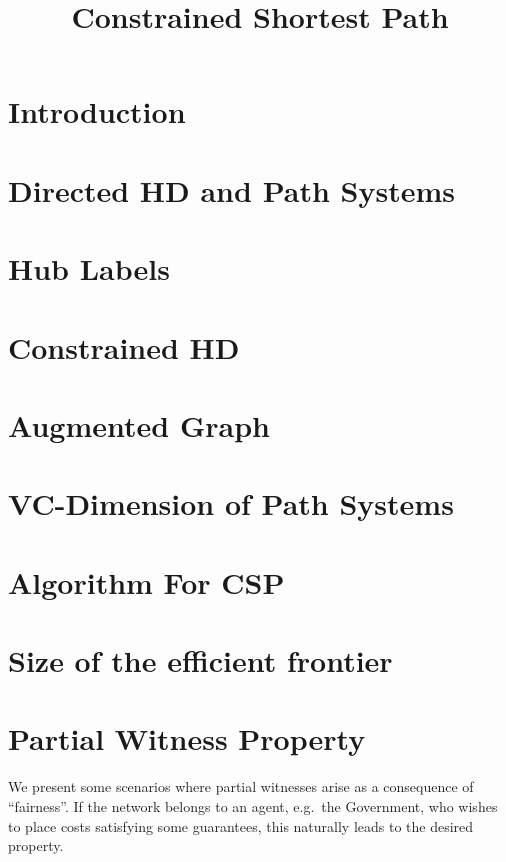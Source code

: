 \documentclass[letterpaper,11pt]{article}
\title{\vspace{-1cm} \bf Constrained Shortest Path \vspace{-1.3cm}}
\author{}
\theoremstyle{plain}
\begin{document}
\maketitle

\section{Introduction}


\section{Directed HD and Path Systems}


\section{Hub Labels}


\section{Constrained HD}


\section{Augmented Graph}



\section{VC-Dimension of Path Systems}



\section{Algorithm For CSP}


\section{Size of the efficient frontier}



\section{Partial Witness Property}

We present some scenarios where partial witnesses arise as a consequence of ``fairness''.
If the network belongs to an agent, e.g.\ the Government, who wishes to place costs satisfying some guarantees, this naturally leads to the desired property.
\end{document}
